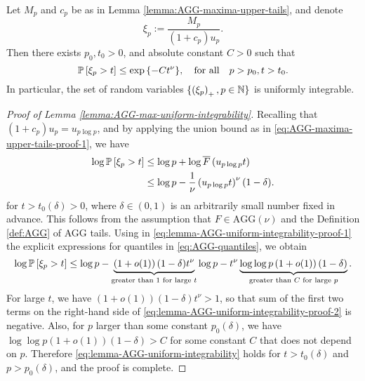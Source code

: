 \begin{lemma} \label{lemma:AGG-max-uniform-integrability}
Let $M_p$ and $c_p$ be as in Lemma \ref{lemma:AGG-maxima-upper-tails}, and denote 
$$
\xi_p := \frac{M_p}{(1+c_p)u_p}.
$$
Then there exists $p_0,t_0 > 0$, and absolute constant $C>0$ such that
\begin{equation} \label{eq:lemma-AGG-uniform-integrability}
    \P\left[\xi_p > t \right]\le \exp{\{-Ct^\nu\}}, \quad \text{for all} \quad p>p_0, t>t_0.
\end{equation}
In particular, the set of random variables $\{\left(\xi_p\right)_+,p\in\mathbb N\}$ is uniformly integrable.
\end{lemma}
\begin{proof}[Proof of Lemma \ref{lemma:AGG-max-uniform-integrability}]
Recalling that $(1+c_p)u_p = u_{p\log{p}}$, and by applying the union bound as in \eqref{eq:AGG-maxima-upper-tails-proof-1}, we have
\begin{align}
    \log \P\left[\xi_p > t\right] 
        &\le \log p + \log{\overline{F}\left(u_{p\log{p}}t\right)} \nonumber \\
        &\le \log p - \frac{1}{\nu}\left(u_{p\log{p}}t\right)^\nu(1-\delta). \label{eq:lemma-AGG-uniform-integrability-proof-1}
\end{align}
for $t > t_0(\delta)>0$, where $\delta\in(0,1)$ is an arbitrarily small number fixed in advance. 
This follows from the assumption that $F\in\text{AGG}(\nu)$ and the Definition \ref{def:AGG} of AGG tails.
Using in \eqref{eq:lemma-AGG-uniform-integrability-proof-1} the explicit expressions for quantiles in \eqref{eq:AGG-quantiles}, we obtain
\begin{equation} \label{eq:lemma-AGG-uniform-integrability-proof-2}
    \log \P\left[\xi_p > t\right] \le \log p - \underbrace{\left(1+o(1)\right)(1-\delta)t^\nu}_{\text{greater than }1\text{ for large }t}\log{p} - t^\nu\underbrace{\log{\log{p}}\left(1+o(1)\right)(1-\delta)}_{\text{greater than }C\text{ for large }p}.
\end{equation}
For large $t$, we have $\left(1+o(1)\right)(1-\delta)t^\nu > 1$, so that sum of the first two terms on the right-hand side of \eqref{eq:lemma-AGG-uniform-integrability-proof-2} is negative.
Also, for $p$ larger than some constant $p_0(\delta)$, we have $\log{\log{p}}\left(1+o(1)\right)(1-\delta) > C$ for some constant $C$ that does not depend on $p$.
Therefore \eqref{eq:lemma-AGG-uniform-integrability} holds for $t>t_0(\delta)$ and $p>p_0(\delta)$, and the proof is complete.
\end{proof}

